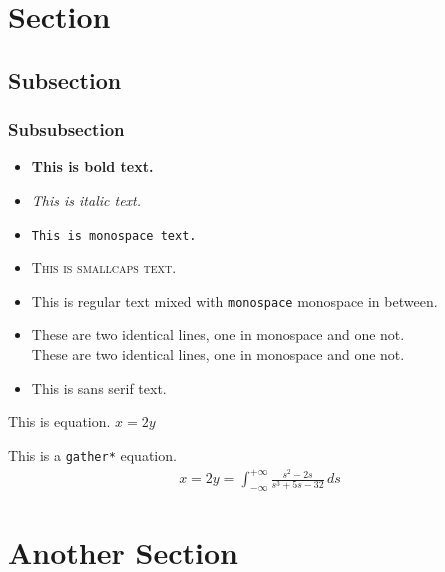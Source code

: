 \documentclass[english,fira]{ist-report}
\author{Daniel de Schiffart}
\begin{document}
\makeheader

\section{Section}

\lipsum[1]

\subsection{Subsection}

\lipsum[1-2]

\subsubsection{Subsubsection}

\begin{itemize}
	\item \textbf{This is bold text.}
	\item \textit{This is italic text.}
	\item \texttt{This is monospace text.}
	\item \textsc{This is smallcaps text.}
	\item This is regular text mixed with \texttt{monospace} monospace in between.
	\item These are two identical lines, one in monospace and one not. \\ {\ttfamily These are two identical lines, one in monospace and one not.}
	\item \textsf{This is sans serif text.}
\end{itemize}

This is equation. $x = 2y$

This is a \texttt{gather*} equation.
\begin{gather*}
	x = 2y = \int_{-\infty}^{+\infty}\frac{s^2 - 2s}{s^3 + 5s - 32}\,ds
\end{gather*}

\section{Another Section}

\lipsum[1-3]
\end{document}

